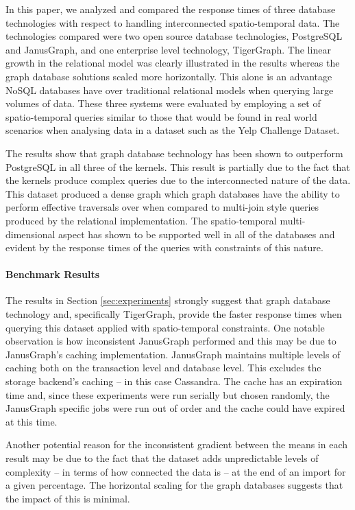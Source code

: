 In this paper, we analyzed and compared the response times of three database technologies with respect to handling interconnected spatio-temporal data. The technologies compared were two open source database technologies, PostgreSQL and JanusGraph, and one enterprise level technology, TigerGraph. The linear growth in the relational model was clearly illustrated in the results whereas the graph database solutions scaled more horizontally. This alone is an advantage NoSQL databases have over traditional relational models when querying large volumes of data. These three systems were evaluated by employing a set of spatio-temporal queries similar to those that would be found in real world scenarios when analysing data in a dataset such as the Yelp Challenge Dataset. 

The results show that graph database technology has been shown to outperform PostgreSQL in all three of the kernels. This result is partially due to the fact that the kernels produce complex queries due to the interconnected nature of the data. This dataset produced a dense graph which graph databases have the ability to perform effective traversals over when compared to multi-join style queries produced by the relational implementation. The spatio-temporal multi-dimensional aspect has shown to be supported well in all of the databases and evident by the response times of the queries with constraints of this nature.

\paragraph{Benchmark Results}

The results in Section \ref{sec:experiments} strongly suggest that graph database technology and, specifically TigerGraph, provide the faster response times when querying this dataset applied with spatio-temporal constraints. One notable observation is how inconsistent JanusGraph performed and this may be due to JanusGraph's caching implementation. JanusGraph maintains multiple levels of caching both on the transaction level and database level. This excludes the storage backend's caching -- in this case Cassandra. The cache has an expiration time and, since these experiments were run serially but chosen randomly, the JanusGraph specific jobs were run out of order and the cache could have expired at this time.

Another potential reason for the inconsistent gradient between the means in each result may be due to the fact that the dataset adds unpredictable levels of complexity -- in terms of how connected the data is -- at the end of an import for a given percentage. The horizontal scaling for the graph databases suggests that the impact of this is minimal.

